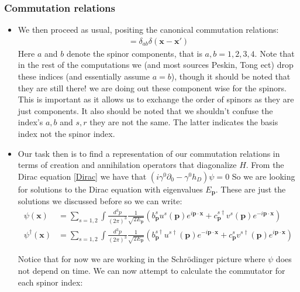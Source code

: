\documentclass[11pt]{article}
\numberwithin{equation}{section}
\begin{document}
  \subsubsection{Commutation relations}
  \begin{itemize}
    \item We then proceed as usual, positing the canonical commutation relations: 
    \begin{align*}
    [\psi_{a}(\textbf{x}),\psi^{\dagger}_{b}(\textbf{x}')] = \delta_{ab}\delta(\textbf{x}-\textbf{x}')
    \end{align*}
    Here $a$ and $b$ denote the spinor components, that is $a,b=1,2,3,4$. Note that in the rest of the computations we (and most sources Peskin, Tong ect) drop these indices (and essentially assume $a=b$), though it should be noted that they are still there! we are doing out these component wise for the spinors. This is important as it allows us to exchange the order of spinors as they are just components. It also should be noted that we shouldn't confuse the index's $a,b$ and $s,r$ they are not the same. The latter indicates the basis index not the spinor index. 

     \item  Our task then is to find a representation of our commutation relations in terms of creation and annihilation operators that diagonalize $H$. From the Dirac equation \ref{Dirac} we have that $(i\gamma^0\partial_{0}-\gamma^0h_{D})\psi =0 $ So we are looking for solutions to the Dirac equation with eigenvalues $E_{\textbf{p}}$. These are just the solutions we discussed before so we can write: 
    \begin{align}
    \label{psi}
      \psi(\textbf{x}) &= \sum_{s=1,2}\int \frac{d^3p}{(2\pi)^3}\frac{1}{\sqrt{2E_{\textbf{p}}}}\left(b^{s}_{\textbf{p}}u^s(\textbf{p})e^{i\textbf{p}\cdot\textbf{x}}+c^{s \dagger}_{\textbf{p}}v^s(\textbf{p})e^{-i\textbf{p}\cdot\textbf{x}}\right)  \\
      \label{psi_d}
      \psi^{\dagger}(\textbf{x}) &= \sum_{s=1,2}\int \frac{d^3p}{(2\pi)^3}\frac{1}{\sqrt{2E_{\textbf{p}}}}\left(b^{s \dagger}_{\textbf{p}}u^{s\dagger}(\textbf{p})e^{-i\textbf{p}\cdot\textbf{x}}+c^{s }_{\textbf{p}}v^{s\dagger}(\textbf{p})e^{i\textbf{p}\cdot\textbf{x}}\right) 
    \end{align}

    Notice that for now we are working in the Schr\"odinger picture where $\psi$ does not depend on time. 
    We can now attempt to calculate the commutator for each spinor index: 
    \end{itemize}
\end{document}

